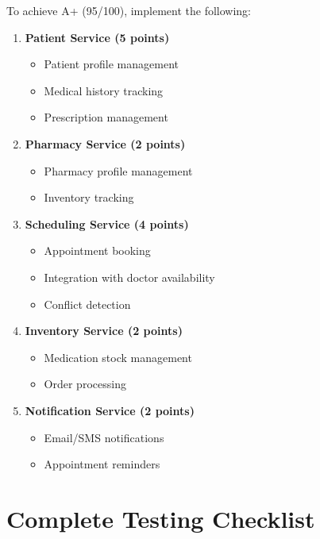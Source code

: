 \documentclass[12pt,a4paper]{article}
\begin{document}
To achieve A+ (95/100), implement the following:

\begin{enumerate}
    \item \textbf{Patient Service (5 points)}
    \begin{itemize}
        \item Patient profile management
        \item Medical history tracking
        \item Prescription management
    \end{itemize}

    \item \textbf{Pharmacy Service (2 points)}
    \begin{itemize}
        \item Pharmacy profile management
        \item Inventory tracking
    \end{itemize}

    \item \textbf{Scheduling Service (4 points)}
    \begin{itemize}
        \item Appointment booking
        \item Integration with doctor availability
        \item Conflict detection
    \end{itemize}

    \item \textbf{Inventory Service (2 points)}
    \begin{itemize}
        \item Medication stock management
        \item Order processing
    \end{itemize}

    \item \textbf{Notification Service (2 points)}
    \begin{itemize}
        \item Email/SMS notifications
        \item Appointment reminders
    \end{itemize}
\end{enumerate}

\section{Complete Testing Checklist}
\end{document}
